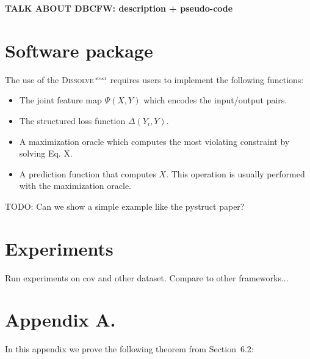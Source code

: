 \documentclass[twoside,11pt]{article}
\newcommand{\algname}{\textsc{Dissolve}$\,^{\textsf{\tiny struct}}$\xspace}
\newcommand{\0}{\mathbf{0}} %
\begin{document}
{\bf TALK ABOUT DBCFW: description + pseudo-code}

\section{Software package}

The use of the \algname requires users to implement the following functions:
\begin{itemize}
\item The joint feature map $\Psi(X,Y)$ which encodes the input/output pairs.
\item The structured loss function $\Delta(Y_i,Y)$.
\item A maximization oracle which computes the most violating constraint by solving Eq. X.
\item A prediction function that computes $X$. This operation is usually performed with the maximization oracle.
\end{itemize}

TODO: Can we show a simple example like the pystruct paper?

\section{Experiments}

Run experiments on cov and other dataset. Compare to other frameworks...




\newpage

\appendix
\section*{Appendix A.}
\label{app:theorem}



In this appendix we prove the following theorem from
Section~6.2:
\end{document}
